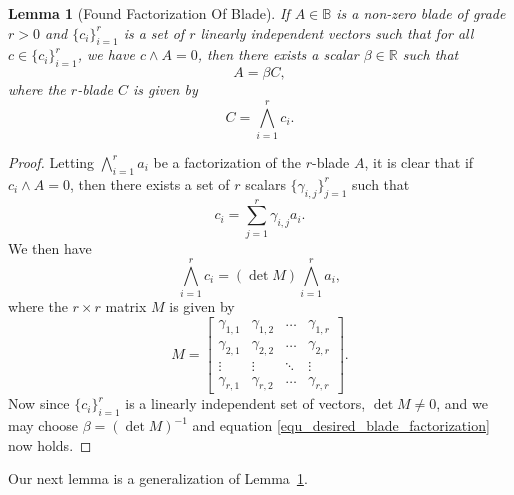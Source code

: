 \documentclass{birkjour}
\newtheorem{lem}[thm]{Lemma}
\theoremstyle{definition}
\theoremstyle{remark}
\numberwithin{equation}{section}
\newcommand{\R}{\mathbb{R}}
\newcommand{\B}{\mathbb{B}}
\begin{document}
\begin{lem}[Found Factorization Of Blade]\label{lem_desired_blade_factorization}
If $A\in\B$ is a non-zero blade of grade $r>0$ and $\{c_i\}_{i=1}^r$ is a set
of $r$ linearly independent vectors such that for all $c\in\{c_i\}_{i=1}^r$, we have
$c\wedge A=0$, then there exists a scalar $\beta\in\R$ such that
\begin{equation}\label{equ_desired_blade_factorization}
A = \beta C,
\end{equation}
where the $r$-blade $C$ is given by
\begin{equation}
C=\bigwedge_{i=1}^r c_i.
\end{equation}
\end{lem}
\begin{proof}
Letting $\bigwedge_{i=1}^r a_i$ be a factorization of the $r$-blade $A$, it is clear
that if $c_i\wedge A=0$, then there exists a set of $r$ scalars $\{\gamma_{i,j}\}_{j=1}^r$
such that
\begin{equation}\label{equ_c_i}
c_i=\sum_{j=1}^r\gamma_{i,j}a_i.
\end{equation}
We then have
\begin{equation}
\bigwedge_{i=1}^r c_i=(\det M)\bigwedge_{i=1}^r a_i,
\end{equation}
where the $r\times r$ matrix $M$ is given by
\begin{equation}
M = \left[\begin{array}{cccc}
\gamma_{1,1} & \gamma_{1,2} & \dots & \gamma_{1,r} \\
\gamma_{2,1} & \gamma_{2,2} & \dots & \gamma_{2,r} \\
\vdots & \vdots & \ddots & \vdots \\
\gamma_{r,1} & \gamma_{r,2} & \dots & \gamma_{r,r}
\end{array}\right].
\end{equation}
Now since $\{c_i\}_{i=1}^r$ is a linearly independent set of vectors,
$\det M\neq 0$, and we may choose $\beta=(\det M)^{-1}$ and
equation \eqref{equ_desired_blade_factorization} now holds.
\end{proof}

Our next lemma is a generalization of Lemma~\ref{lem_desired_blade_factorization}.
\end{document}
